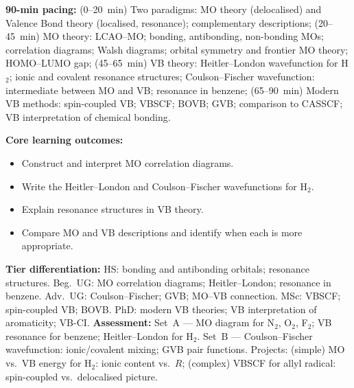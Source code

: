 \documentclass[11pt,a4paper]{article}
\begin{document}
\medskip

\begin{tcolorbox}[chembox, title={Module~III.2 / L11: Orbital Theories and Bonding Models}]
\textbf{90-min pacing:} (0--20~min) Two paradigms: MO theory (delocalised) and Valence Bond theory (localised, resonance); complementary descriptions; (20--45~min) MO theory: LCAO--MO; bonding, antibonding, non-bonding MOs; correlation diagrams; Walsh diagrams; orbital symmetry and frontier MO theory; HOMO--LUMO gap; (45--65~min) VB theory: Heitler--London wavefunction for H$_2$; ionic and covalent resonance structures; Coulson--Fischer wavefunction: intermediate between MO and VB; resonance in benzene; (65--90~min) Modern VB methods: spin-coupled VB; VBSCF; BOVB; GVB; comparison to CASSCF; VB interpretation of chemical bonding.

\medskip\textbf{Core learning outcomes:}
\begin{itemize}[leftmargin=1.4em,topsep=2pt,itemsep=1pt]
  \item Construct and interpret MO correlation diagrams.
  \item Write the Heitler--London and Coulson--Fischer wavefunctions for H$_2$.
  \item Explain resonance structures in VB theory.
  \item Compare MO and VB descriptions and identify when each is more appropriate.
\end{itemize}
\medskip\textbf{Tier differentiation:}
HS: bonding and antibonding orbitals; resonance structures.
Beg.\ UG: MO correlation diagrams; Heitler--London; resonance in benzene.
Adv.\ UG: Coulson--Fischer; GVB; MO--VB connection.
MSc: VBSCF; spin-coupled VB; BOVB.
PhD: modern VB theories; VB interpretation of aromaticity; VB-CI.
\medskip\textbf{Assessment:}
Set~A --- MO diagram for N$_2$, O$_2$, F$_2$; VB resonance for benzene; Heitler--London for H$_2$.
Set~B --- Coulson--Fischer wavefunction: ionic/covalent mixing; GVB pair functions.
Projects: (simple) MO vs.\ VB energy for H$_2$: ionic content vs.\ $R$; (complex) VBSCF for allyl radical: spin-coupled vs.\ delocalised picture.
\end{tcolorbox}

\medskip
\end{document}
